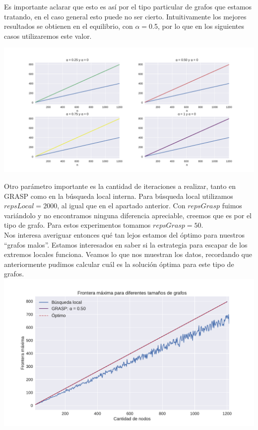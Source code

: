 Es importante aclarar que esto es así por el tipo particular de grafos que estamos tratando, en el caso general esto puede no ser cierto. Intuitivamente los mejores resultados se obtienen en el equilibrio, con $\alpha = $0.5, por lo que en los siguientes casos utilizaremos este valor. \\


{\centering
    \includegraphics[width=1\textwidth]{informe/imgs/exp_malo_frontera_grasp_alphas.pdf}
}


Otro parámetro importante es la cantidad de iteraciones a realizar, tanto en GRASP como en la búsqueda local interna. Para búsqueda local utilizamos $repsLocal = 2000$, al igual que en el apartado anterior. Con $repsGrasp$ fuimos variándolo y no encontramos ninguna diferencia apreciable, creemos que es por el tipo de grafo. Para estos experimentos tomamos $repsGrasp = 50$. \\

Nos interesa averiguar entonces qué tan lejos estamos del óptimo para nuestros ``grafos malos''. Estamos interesados en saber si la estrategia para escapar de los extremos locales funciona. Veamos lo que nos muestran los datos, recordando que anteriormente pudimos calcular cuál es la solución óptima para este tipo de grafos. \\

{\centering
    \includegraphics[width=1\textwidth]{informe/imgs/exp_malo_frontera_grasp_local_optimo.pdf}
}

